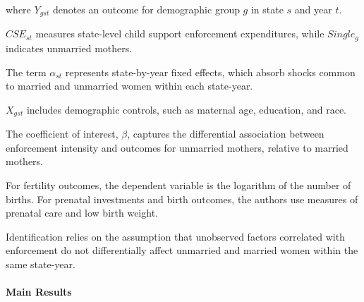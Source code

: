 \documentclass{article}
\begin{document}
where $Y_{gst}$ denotes an outcome for demographic
group $g$ in state $s$ and year $t$.

$CSE_{st}$ measures state-level child support
enforcement expenditures, while $Single_g$
indicates unmarried mothers.

The term $\alpha_{st}$ represents state-by-year
fixed effects, which absorb shocks common to
married and unmarried women within each
state-year.

$X_{gst}$ includes demographic controls,
such as maternal age, education, and race.

The coefficient of interest, $\beta$, captures
the differential association between enforcement
intensity and outcomes for unmarried mothers,
relative to married mothers.

For fertility outcomes, the dependent variable
is the logarithm of the number of births.
For prenatal investments and birth outcomes,
the authors use measures of prenatal care
and low birth weight.

Identification relies on the assumption that
unobserved factors correlated with enforcement
do not differentially affect unmarried and
married women within the same state-year.

\paragraph{Main Results}
\end{document}
